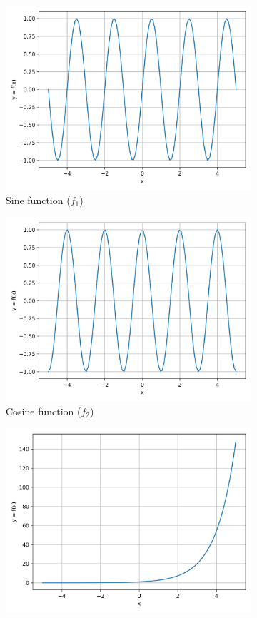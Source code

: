 \documentclass{article}
\begin{document}
\begin{figure}[ht]
  \begin{subfigure}{.5\textwidth}
    \centering
    \includegraphics[width=.8\linewidth]{functions/sin.png}
    \caption{Sine function ($f_1$)}
  \end{subfigure}
  \begin{subfigure}{.5\textwidth}
    \centering
    \includegraphics[width=.8\linewidth]{functions/cos.png}
    \caption{Cosine function ($f_2$)}
  \end{subfigure}
  \begin{subfigure}{.5\textwidth}
    \centering
    \includegraphics[width=.8\linewidth]{functions/exp.png}

\end{subfigure}
\end{figure}
\end{document}
